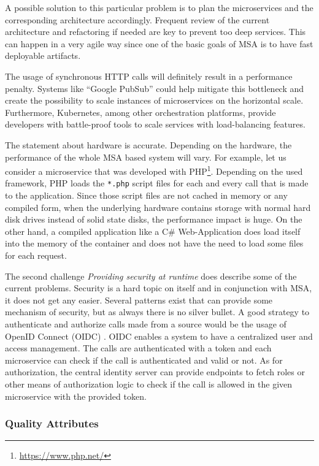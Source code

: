 A possible solution to this particular problem is to plan
the microservices and the corresponding architecture accordingly.
Frequent review of the current architecture and refactoring \cite{zio:ARforCloud}
if needed are key to prevent too deep services. This can happen
in a very agile way since one of the basic goals of MSA is
to have fast deployable artifacts.

The usage of synchronous HTTP calls will definitely result
in a performance penalty. Systems like ``Google PubSub'' could help
mitigate this bottleneck and create the possibility to scale
instances of microservices on the horizontal scale.
Furthermore, Kubernetes, among other orchestration platforms, provide developers with
battle-proof tools to scale services with load-balancing features.

The statement about hardware is accurate. Depending on the hardware,
the performance of the whole MSA based system will vary. For example,
let us consider a microservice that was developed with
PHP\footnote{\url{https://www.php.net/}}. Depending on the used framework,
PHP loads the \texttt{*.php} script files for each and every call that
is made to the application. Since those script files are not cached
in memory or any compiled form, when the underlying hardware contains
storage with normal hard disk drives instead of solid state disks,
the performance impact is huge. On the other hand, a compiled application
like a C\# Web-Application does load itself into the memory of the
container and does not have the need to load some files for each request.

The second challenge \textit{Providing security at runtime} does
describe some of the current problems. Security is a hard topic
on itself and in conjunction with MSA, it does not get any easier.
Several patterns exist that can provide some mechanism of security,
but as always there is no silver bullet. A good strategy to
authenticate and authorize calls made from a source would be the usage
of OpenID Connect (OIDC) \cite{Siriwardena:OIDC}. OIDC enables
a system to have a centralized user and access management. The
calls are authenticated with a token and each microservice can check
if the call is authenticated and valid or not. As for authorization,
the central identity server can provide endpoints to fetch roles
or other means of authorization logic to check if the call is allowed
in the given microservice with the provided token.

\subsubsection{Quality Attributes}


